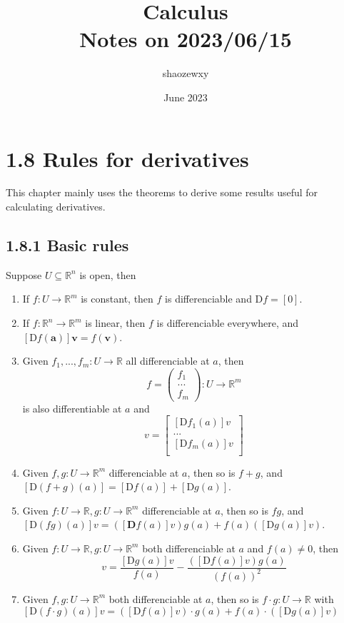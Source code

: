\documentclass{article}
\title{Calculus\\
\large{Notes on 2023/06/15}}
\author{shaozewxy }
\date{June 2023}
\begin{document}
\maketitle
\section*{1.8 Rules for derivatives}
This chapter mainly uses the theorems to derive some results useful for calculating derivatives.
\subsection*{1.8.1 Basic rules}
Suppose $U \subseteq \mathbb{R}^n$ is open, then
\begin{enumerate}
    \item If $f: U \rightarrow \mathbb{R}^m$ is constant, then $f$ is differenciable and $\mathrm{D}f = [0]$.
    \item If $f: \mathbb{R}^n \rightarrow \mathbb{R}^m$ is linear, then $f$ is differenciable everywhere, and $[\mathrm{D}f(\mathbf{a})]\mathbf{v} = f(\mathbf{v})$.
    \item Given $f_1, ..., f_m: U \rightarrow \mathbb{R}$ all differenciable at $a$, then
    \begin{equation*}
        f = \begin{pmatrix}
            f_1\\
            ...\\
            f_m
        \end{pmatrix}: U \rightarrow \mathbb{R}^m
    \end{equation*}
    is also differentiable at $a$ and
    \begin{equation*}
        [\mathrm{D}f(a)]v = \begin{bmatrix}
            [\mathrm{D}f_1(a)]v\\
            ...\\
            [\mathrm{D}f_m(a)]v\\
        \end{bmatrix}
    \end{equation*}
    \item Given $f, g: U \rightarrow \mathbb{R}^m$ differenciable at $a$, then so is $f+g$, and $[\mathrm{D}(f+g)(a)] = [\mathrm{D}f(a)]+[\mathrm{D}g(a)]$.
    \item Given $f: U \rightarrow \mathbb{R}, g: U \rightarrow \mathbb{R}^m$ differenciable at $a$, then so is $fg$, and $[\mathrm{D}(fg)(a)]v = ([\mathbf{D}f(a)]v)g(a) + f(a)([\mathrm{D}g(a)]v)$.
    \item Given $f: U \rightarrow \mathbb{R}, g: U \rightarrow \mathbb{R}^m$ both differenciable at $a$ and $f(a) \ne 0$, then
    \begin{equation*}
        [\mathrm{D}(\frac{g}{f})(a)]v = \frac{[\mathrm{D}g(a)]v}{f(a)} - \frac{([\mathrm{D}f(a)]v)g(a)}{(f(a))^2}
    \end{equation*} 
    \item Given $f, g: U \rightarrow \mathbb{R}^m$ both differenciable at $a$, then so is $f \cdot g: U \rightarrow \mathbb{R}$ with $[\mathrm{D}(f\cdot g)(a)]v = ([\mathrm{D}f(a)]v)\cdot g(a) + f(a)\cdot ([\mathrm{D}g(a)]v)$
\end{enumerate}
\end{document}
